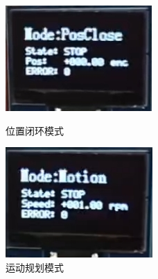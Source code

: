 ﻿\documentclass[12pt,a4paper]{article}
\begin{document}
\begin{figure}[!htbp]
\begin{minipage}{0.29\linewidth}
    \includegraphics[width=\linewidth]{picture/MODE4.png}
    \caption{位置闭环模式}
    \label{test2}%
  \end{minipage}
  \begin{minipage}{0.29\linewidth}
    \centering
    \includegraphics[width=\linewidth]{picture/MODE3.png}
    \caption{运动规划模式}
    \label{test3}%
  \end{minipage}
  \begin{minipage}{0.29\linewidth}
    \centering

\end{minipage}
\end{figure}
\end{document}

